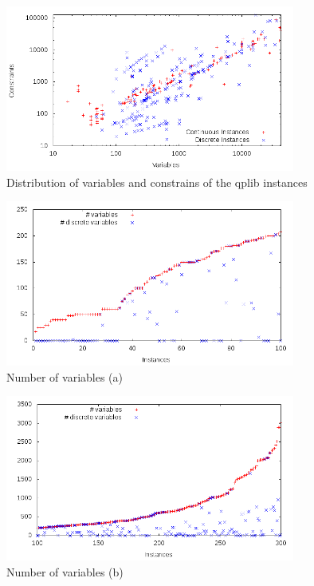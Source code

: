 


\begin{figure}\centering
  \includegraphics[width=0.85\textwidth]{pic_overview.png}
  \caption{Distribution of variables and constrains  of the qplib
instances \label{fig:1}}
\end{figure}

\begin{figure}\centering
  \includegraphics[width=0.85\textwidth]{pic_var_small.png}
  \caption{Number of variables (a) \label{fig:pic_var_small}}
\end{figure}

\begin{figure}\centering
  \includegraphics[width=0.85\textwidth]{pic_var_medium.png}
  \caption{Number of variables (b) \label{fig:pic_var_medium}}
\end{figure}

